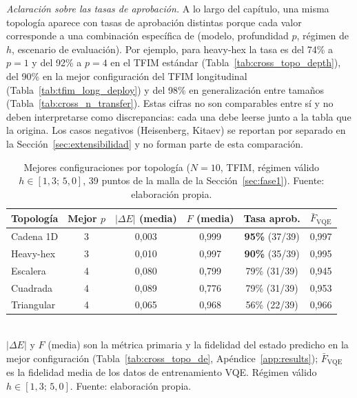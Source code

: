 \documentclass[11pt,a4paper,spanish]{book}
\begin{document}
\noindent\textit{Aclaración sobre las tasas de aprobación.} A lo largo del capítulo, una misma topología aparece con tasas de aprobación distintas porque cada valor corresponde a una combinación específica de (modelo, profundidad $p$, régimen de $h$, escenario de evaluación). Por ejemplo, para heavy-hex la tasa es del 74\% a $p = 1$ y del 92\% a $p = 4$ en el TFIM estándar (Tabla~\ref{tab:cross_topo_depth}), del 90\% en la mejor configuración del TFIM longitudinal (Tabla~\ref{tab:tfim_long_deploy}) y del 98\% en generalización entre tamaños (Tabla~\ref{tab:cross_n_transfer}). Estas cifras no son comparables entre sí y no deben interpretarse como discrepancias: cada una debe leerse junto a la tabla que la origina. Los casos negativos (Heisenberg, Kitaev) se reportan por separado en la Sección~\ref{sec:extensibilidad} y no forman parte de esta comparación.

\begin{table}[h]
\centering
\caption[Mejores configuraciones por topología ($N = 10$)]{Mejores configuraciones por topología ($N = 10$, TFIM, régimen válido $h \in [1{,}3;\, 5{,}0]$, 39 puntos de la malla de la Sección~\ref{sec:fase1}). Fuente: elaboración propia.}
\label{tab:cross_topo}
\begin{tabular}{lccccc}
\toprule
\textbf{Topología} & \textbf{Mejor $p$} & \textbf{$|\Delta E|$ (media)} & \textbf{$F$ (media)} & \textbf{Tasa aprob.} & \textbf{$\bar{F}_{\text{VQE}}$} \\
\midrule
Cadena 1D & 3 & 0,003 & 0,999 & \textbf{95\%} (37/39) & 0,997 \\
Heavy-hex & 3 & 0,010 & 0,997 & \textbf{90\%} (35/39) & 0,995 \\
Escalera & 4 & 0,080 & 0,799 & 79\% (31/39) & 0,945 \\
Cuadrada & 4 & 0,089 & 0,776 & 79\% (31/39) & 0,953 \\
Triangular & 4 & 0,065 & 0,968 & 56\% (22/39) & 0,966 \\
\bottomrule
\end{tabular}
\\[2pt]
\footnotesize $|\Delta E|$ y $F$ (media) son la métrica primaria y la fidelidad del estado predicho en la mejor configuración (Tabla~\ref{tab:cross_topo_de}, Apéndice~\ref{app:results}); $\bar{F}_{\text{VQE}}$ es la fidelidad media de los datos de entrenamiento VQE. Régimen válido $h \in [1{,}3;\, 5{,}0]$. Fuente: elaboración propia.
\end{table}
\end{document}

